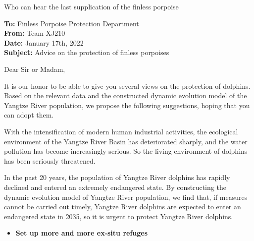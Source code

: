 \documentclass[12pt]{article}  %
\begin{document}
\begin{letter}{Who can hear the last supplication of the finless porpoise}
\begin{flushleft}  %
\textbf{To:} Finless Porpoise Protection Department\\
\textbf{From:} Team XJ210\\
\textbf{Date:} January 17th, 2022\\
\textbf{Subject:} Advice on the protection of finless porpoises
\end{flushleft}
Dear Sir or Madam,

It is our honor to be able to give you several views on the protection of dolphins. Based on the relevant data and the constructed dynamic evolution model of the Yangtze River population, we propose the following suggestions, hoping that you can adopt them.

With the intensification of modern human industrial activities, the ecological environment of the Yangtze River Basin has deteriorated sharply, and the water pollution has become increasingly serious. So the living environment of dolphins has been seriously threatened.

In the past 20 years, the population of Yangtze River dolphins has rapidly declined and entered an extremely endangered state. By constructing the dynamic evolution model of Yangtze River population, we find that, if measures cannot be carried out timely, Yangtze River dolphins are expected to enter an endangered state in 2035, so it is urgent to protect Yangtze River dolphins.


\begin{itemize}
    \item  \textbf{Set up more and more ex-situ refuges}
 \end{itemize}



\end{letter}
\end{document}
